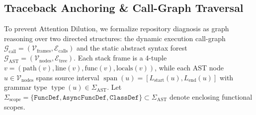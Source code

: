 \documentclass[10pt,twocolumn]{article}
\begin{document}
\subsection{Traceback Anchoring \& Call-Graph Traversal}
To prevent Attention Dilution, we formalize repository diagnosis as graph reasoning over two directed structures: the dynamic execution call-graph $\mathcal{G}_{\text{call}} = (\mathcal{V}_{\text{frames}}, \mathcal{E}_{\text{calls}})$ and the static abstract syntax forest $\mathcal{G}_{\text{AST}} = (\mathcal{V}_{\text{nodes}}, \mathcal{E}_{\text{tree}})$. Each stack frame is a 4-tuple $v = (\text{path}(v), \text{line}(v), \text{func}(v), \text{locals}(v))$, while each AST node $u \in \mathcal{V}_{\text{nodes}}$ spans source interval $\operatorname{span}(u) = [L_{\text{start}}(u), L_{\text{end}}(u)]$ with grammar type $\operatorname{type}(u) \in \Sigma_{\text{AST}}$. Let $\Sigma_{\text{scope}} = \{\texttt{FuncDef}, \texttt{AsyncFuncDef}, \texttt{ClassDef}\} \subset \Sigma_{\text{AST}}$ denote enclosing functional scopes.
\end{document}
